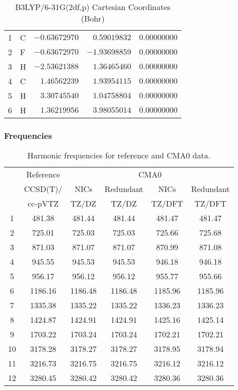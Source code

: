 \documentclass[10pt,oneside]{article}
\begin{document}
\begin{table}[h]
\centering
\caption{B3LYP/6-31G(2df,p) Cartesian Coordinates (Bohr)}
\begin{tabular}{llrrr}
\toprule
1  & C  & $-0.63672970$ & $ 0.59019832$ & $ 0.00000000$ \\
2  & F  & $-0.63672970$ & $-1.93698859$ & $ 0.00000000$ \\
3  & H  & $-2.53621388$ & $ 1.36465460$ & $ 0.00000000$ \\
4  & C  & $ 1.46562239$ & $ 1.93954115$ & $ 0.00000000$ \\
5  & H  & $ 3.30745540$ & $ 1.04758804$ & $ 0.00000000$ \\
6  & H  & $ 1.36219956$ & $ 3.98055014$ & $ 0.00000000$ \\
\bottomrule
\end{tabular}
\end{table}

\begin{table}[h!]
\subsubsection*{Frequencies}
\centering
\caption{Harmonic frequencies for reference and CMA0 data.}
\begin{tabular}{cccccc}
\toprule
{} & Reference & \multicolumn{4}{c}{CMA0} \\
{} &  CCSD(T)/ &    NICs &  Redundant &    NICs & Redundant \\
{} &   cc-pVTZ &   TZ/DZ &      TZ/DZ &  TZ/DFT &    TZ/DFT \\
\midrule
1  &    481.38 &  481.44 &     481.44 &  481.47 &    481.47 \\
2  &    725.01 &  725.03 &     725.03 &  725.66 &    725.68 \\
3  &    871.03 &  871.07 &     871.07 &  870.99 &    871.08 \\
4  &    945.55 &  945.53 &     945.53 &  946.18 &    946.18 \\
5  &    956.17 &  956.12 &     956.12 &  955.77 &    955.66 \\
6  &   1186.16 & 1186.48 &    1186.48 & 1185.96 &   1185.96 \\
7  &   1335.38 & 1335.22 &    1335.22 & 1336.23 &   1336.23 \\
8  &   1424.87 & 1424.91 &    1424.91 & 1425.16 &   1425.14 \\
9  &   1703.22 & 1703.24 &    1703.24 & 1702.21 &   1702.21 \\
10 &   3178.28 & 3178.27 &    3178.27 & 3178.95 &   3178.94 \\
11 &   3216.73 & 3216.75 &    3216.75 & 3216.12 &   3216.12 \\
12 &   3280.45 & 3280.42 &    3280.42 & 3280.36 &   3280.36 \\
\bottomrule
\end{tabular}
\end{table}
\end{document}

